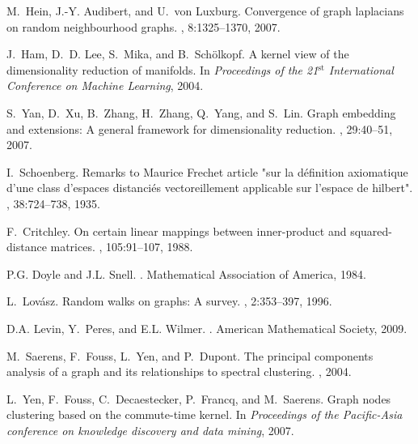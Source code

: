 \documentclass[10pt,twocolumn]{article}
\numberwithin{equation}{section}
\begin{document}
\begin{thebibliography}{10}
M.~Hein, J.-Y. Audibert, and U.~von Luxburg.
\newblock Convergence of graph laplacians on random neighbourhood graphs.
, 8:1325--1370, 2007.

J.~Ham, D.~D. Lee, S.~Mika, and B.~Sch\"{o}lkopf.
\newblock A kernel view of the dimensionality reduction of manifolds.
\newblock In {\em Proceedings of the 21$^{\textrm{st}}$ International
  Conference on Machine Learning}, 2004.

S.~Yan, D.~Xu, B.~Zhang, H.~Zhang, Q.~Yang, and S.~Lin.
\newblock Graph embedding and extensions: A general framework for
  dimensionality reduction.
,
  29:40--51, 2007.

I.~Schoenberg.
\newblock Remarks to {M}aurice {F}rechet article "sur la d\'{e}finition
  axiomatique d'une class d'espaces distanci\'{e}s vectoreillement applicable
  sur l'espace de hilbert".
, 38:724--738, 1935.

F.~Critchley.
\newblock On certain linear mappings between inner-product and squared-distance
  matrices.
, 105:91--107, 1988.

P.G. Doyle and J.L. Snell.
.
\newblock Mathematical Association of America, 1984.

L.~Lov\'{a}sz.
\newblock Random walks on graphs: A survey.
, 2:353--397, 1996.

D.A. Levin, Y.~Peres, and E.L. Wilmer.
.
\newblock American Mathematical Society, 2009.

M.~Saerens, F.~Fouss, L.~Yen, and P.~Dupont.
\newblock The principal components analysis of a graph and its relationships to
  spectral clustering.
, 2004.

L.~Yen, F.~Fouss, C.~Decaestecker, P.~Francq, and M.~Saerens.
\newblock Graph nodes clustering based on the commute-time kernel.
\newblock In {\em Proceedings of the {P}acific-{A}sia conference on knowledge
  discovery and data mining}, 2007.


\end{thebibliography}
\end{document}

